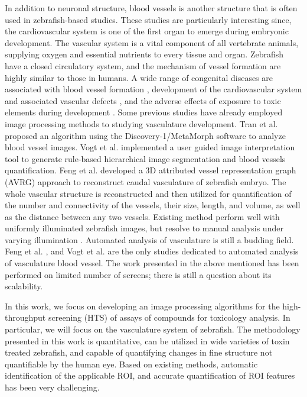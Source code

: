 \par
In addition to neuronal structure, blood vessels is another structure that is often used in zebrafish-based studies. These studies are particularly interesting since, the cardiovascular system is one of the first organ to emerge during embryonic development. The vascular system is a vital component of all vertebrate animals, supplying oxygen and essential nutrients to every tissue and organ. Zebrafish have a closed circulatory system, and the mechanism of vessel formation are highly similar to those in humans.  A wide range of congenital diseases are associated with blood vessel formation \cite{folkman1995}, development of the cardiovascular system and associated vascular defects \cite{shalaby1995}, and the adverse effects of exposure to toxic elements during development \cite{kleinstreuer2011}. Some previous studies have already employed image processing methods to studying vasculature development. Tran et al. \cite{Tran07} proposed an algorithm using the Discovery-1/MetaMorph software to analyze blood vessel images. Vogt et al. \cite{Vogt09} implemented a user guided image interpretation tool to generate rule-based hierarchical image segmentation and blood vessels quantification. Feng et al. \cite{Feng05} developed a 3D attributed vessel representation graph (AVRG) approach to reconstruct caudal vasculature of zebrafish embryo. The whole vascular structure is reconstructed and then utilized for quantification of the number and connectivity of the vessels, their size, length, and volume, as well as the distance between any two vessels. Existing method perform well with uniformly illuminated zebrafish images, but resolve to manual analysis under varying illumination \cite{Tran07}. Automated analysis of vasculature is still a budding field. Feng et al. \cite{Feng05}, and Vogt et al. \cite{Vogt09} are the only studies dedicated to automated analysis of vasculature blood vessel. The work presented in the above mentioned has been performed on limited number of screens; there is still a question about its scalability. %

\par
In this work, we focus on developing an image processing algorithms for the high-throughput screening (HTS) of assays of compounds for toxicology analysis. In particular, we will focus on the vasculature system of zebrafish. The methodology presented in this work is quantitative, can be utilized in wide varieties of toxin treated zebrafish, and capable of quantifying changes in ﬁne structure not quantiﬁable by the human eye. Based on existing methods, automatic identification of the applicable ROI, and accurate quantification of ROI features has been very challenging. 


